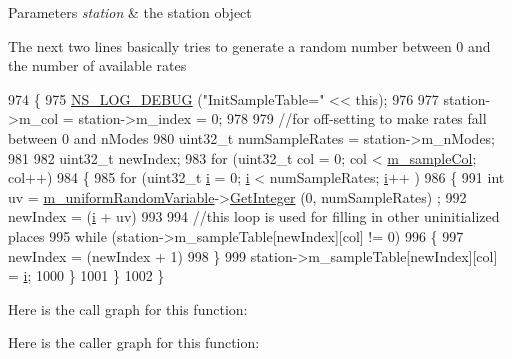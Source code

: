 \begin{DoxyParams}{Parameters}
{\em station} & the station object \\
\hline
\end{DoxyParams}
The next two lines basically tries to generate a random number between 0 and the number of available rates
\begin{DoxyCode}
974 \{
975   \hyperlink{group__logging_ga413f1886406d49f59a6a0a89b77b4d0a}{NS\_LOG\_DEBUG} (\textcolor{stringliteral}{"InitSampleTable="} << \textcolor{keyword}{this});
976 
977   station->m\_col = station->m\_index = 0;
978 
979   \textcolor{comment}{//for off-setting to make rates fall between 0 and nModes}
980   uint32\_t numSampleRates = station->m\_nModes;
981 
982   uint32\_t newIndex;
983   \textcolor{keywordflow}{for} (uint32\_t col = 0; col < \hyperlink{classns3_1_1MinstrelWifiManager_a2112a731d89b8cd936a7f659aa678a15}{m\_sampleCol}; col++)
984     \{
985       \textcolor{keywordflow}{for} (uint32\_t \hyperlink{bernuolliDistribution_8m_a6f6ccfcf58b31cb6412107d9d5281426}{i} = 0; \hyperlink{bernuolliDistribution_8m_a6f6ccfcf58b31cb6412107d9d5281426}{i} < numSampleRates; \hyperlink{bernuolliDistribution_8m_a6f6ccfcf58b31cb6412107d9d5281426}{i}++ )
986         \{
991           \textcolor{keywordtype}{int} uv = \hyperlink{classns3_1_1MinstrelWifiManager_a63a489eb04c046ac3fe29b514d5eb028}{m\_uniformRandomVariable}->\hyperlink{classns3_1_1RandomVariableStream_a66cd94e6305ce7f000f1a9ff0fcb9aef}{GetInteger} (0, numSampleRates)
      ;
992           newIndex = (\hyperlink{bernuolliDistribution_8m_a6f6ccfcf58b31cb6412107d9d5281426}{i} + uv) %
993 
994           \textcolor{comment}{//this loop is used for filling in other uninitialized places}
995           \textcolor{keywordflow}{while} (station->m\_sampleTable[newIndex][col] != 0)
996             \{
997               newIndex = (newIndex + 1) %
998             \}
999           station->m\_sampleTable[newIndex][col] = \hyperlink{bernuolliDistribution_8m_a6f6ccfcf58b31cb6412107d9d5281426}{i};
1000         \}
1001     \}
1002 \}
\end{DoxyCode}


Here is the call graph for this function\+:




Here is the caller graph for this function\+:


